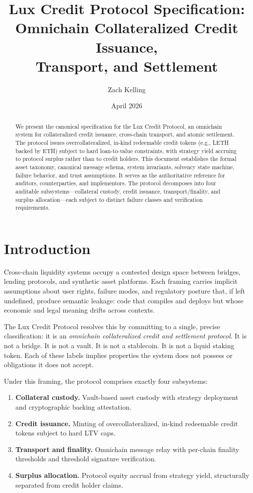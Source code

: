 \documentclass[11pt,twocolumn]{article}
\title{Lux Credit Protocol Specification:\\Omnichain Collateralized Credit Issuance,\\Transport, and Settlement}
\author{Zach Kelling}
\date{April 2026}
\theoremstyle{remark}
\begin{document}
\luxcoverpage

\maketitle

\begin{abstract}
We present the canonical specification for the Lux Credit Protocol, an omnichain system for collateralized credit issuance, cross-chain transport, and atomic settlement. The protocol issues overcollateralized, in-kind redeemable credit tokens (e.g., LETH backed by ETH) subject to hard loan-to-value constraints, with strategy yield accruing to protocol surplus rather than to credit holders. This document establishes the formal asset taxonomy, canonical message schema, system invariants, solvency state machine, failure behavior, and trust assumptions. It serves as the authoritative reference for auditors, counterparties, and implementors. The protocol decomposes into four auditable subsystems---collateral custody, credit issuance, transport/finality, and surplus allocation---each subject to distinct failure classes and verification requirements.
\end{abstract}

\section{Introduction}
\label{sec:intro}

Cross-chain liquidity systems occupy a contested design space between bridges, lending protocols, and synthetic asset platforms. Each framing carries implicit assumptions about user rights, failure modes, and regulatory posture that, if left undefined, produce semantic leakage: code that compiles and deploys but whose economic and legal meaning drifts across contexts.

The Lux Credit Protocol resolves this by committing to a single, precise classification: it is an \emph{omnichain collateralized credit and settlement protocol}. It is not a bridge. It is not a vault. It is not a stablecoin. It is not a liquid staking token. Each of these labels implies properties the system does not possess or obligations it does not accept.

Under this framing, the protocol comprises exactly four subsystems:

\begin{enumerate}[nosep]
  \item \textbf{Collateral custody.} Vault-based asset custody with strategy deployment and cryptographic backing attestation.
  \item \textbf{Credit issuance.} Minting of overcollateralized, in-kind redeemable credit tokens subject to hard LTV caps.
  \item \textbf{Transport and finality.} Omnichain message relay with per-chain finality thresholds and threshold signature verification.
  \item \textbf{Surplus allocation.} Protocol equity accrual from strategy yield, structurally separated from credit holder claims.
\end{enumerate}
\end{document}
